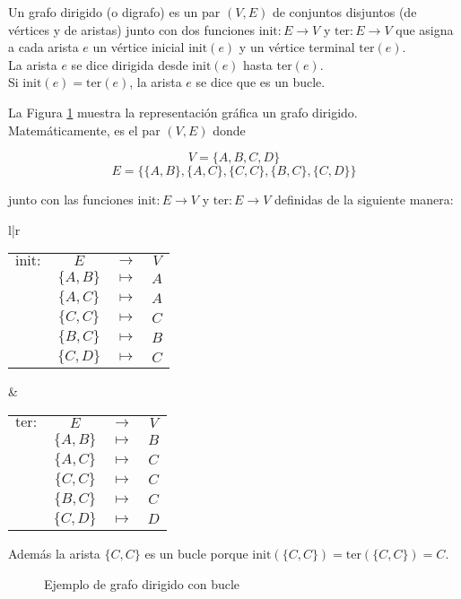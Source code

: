 \begin{defi}
Un grafo dirigido (o digrafo) es un par $(V,E)$ de conjuntos disjuntos (de vértices y de aristas) junto con dos funciones $\mathrm{init} : E \to V$ y $\mathrm{ter} : E \to V$ que asigna a cada arista $e$ un vértice inicial $\mathrm{init}(e)$ y un vértice terminal $\mathrm{ter}(e)$.\\

La arista $e$ se dice dirigida desde $\mathrm{init}(e)$ hasta $\mathrm{ter}(e)$.\\

Si $\mathrm{init}(e) = \mathrm{ter}(e)$, la arista $e$ se dice que es un bucle.
\end{defi}

\begin{ejemplo}
La Figura \ref*{fig:grafo_dirigido} muestra la representación gráfica un grafo dirigido. Matemáticamente, es el par $(V,E)$ donde

\[V  = \{A, B, C, D\}\]
\[E = \{ \{A,B\}, \{A,C\}, \{C,C\},\{B,C\}, \{C,D\} \} \]

junto con las funciones $\mathrm{init} : E \to V $ y $\mathrm{ter} : E \to V$ definidas de la siguiente manera:

\begin{center}
\begin{tabular}{l|r}
\begin{tabular}{r c c c}
$\mathrm{init}:$ & $E$ & $\to$ & $V$\\
			     & $\{A,B\}$ & $\mapsto$ & $A$\\
			     & $\{A,C\}$ & $\mapsto$ & $A$\\
			     & $\{C,C\}$ & $\mapsto$ & $C$\\
			     & $\{B,C\}$ & $\mapsto$ & $B$\\
			     & $\{C,D\}$ & $\mapsto$ & $C$\\
			      
\end{tabular} &
\begin{tabular}{r c c c}
$\mathrm{ter}:$ & $E$ & $\to$ & $V$\\
			     & $\{A,B\}$ & $\mapsto$ & $B$\\
			     & $\{A,C\}$ & $\mapsto$ & $C$\\
			     & $\{C,C\}$ & $\mapsto$ & $C$\\
			     & $\{B,C\}$ & $\mapsto$ & $C$\\
			     & $\{C,D\}$ & $\mapsto$ & $D$\\
			      
\end{tabular} 
\end{tabular}
\end{center}

Además la arista $\{C,C\}$ es un bucle porque $\mathrm{init}(\{C,C\}) = \mathrm{ter}(\{C,C\}) = C$.

\begin{figure}[h]
\centering
\ejemplografodirigido
\caption{Ejemplo de grafo dirigido con bucle}
\label{fig:grafo_dirigido}
\end{figure}

\end{ejemplo}

